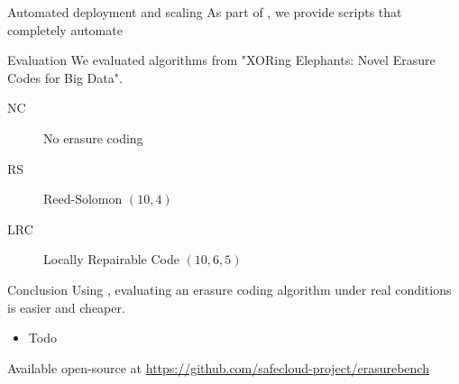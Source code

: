 \begin{frame}{Automated deployment and scaling}
    As part of \sys, we provide scripts that completely automate 
\end{frame}

\subtitle[Evaluation]{Evaluation}

\begin{frame}{Evaluation}
    We evaluated algorithms from "XORing Elephants: Novel Erasure Codes for Big Data".
    \begin{description}
        \item[NC] No erasure coding
        \item[RS] Reed-Solomon $(10,4)$
        \item[LRC] Locally Repairable Code $(10,6,5)$
    \end{description}
\end{frame}

\subtitle[Conclusion]{Conclusion}

\begin{frame}{Conclusion}
    Using \sys, evaluating an erasure coding algorithm under real conditions is easier and cheaper.
    \begin{itemize}
        \item Todo
    \end{itemize}
    
    Available open-source at \url{https://github.com/safecloud-project/erasurebench}
\end{frame}




